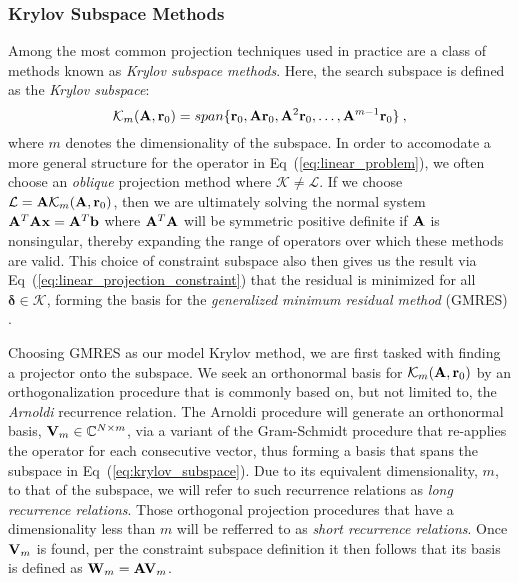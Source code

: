 \subsubsection{Krylov Subspace Methods}
\label{subsubsec:krylov_methods}
Among the most common projection techniques used in practice are a
class of methods known as \textit{Krylov subspace methods}. Here, the
search subspace is defined as the \textit{Krylov subspace}:
\begin{equation}
  \mathcal{K}_m(\mathbf{A},\mathbf{r}_0) = span\{\mathbf{r}_0, \mathbf{A}\mathbf{r}_0,
  \mathbf{A}^2\mathbf{r}_0, \dots, \mathbf{A}^{m-1}\mathbf{r}_0\}\:,
  \label{eq:krylov_subspace}
\end{equation}
where $m$ denotes the dimensionality of the subspace. In order to
accomodate a more general structure for the operator in
Eq~(\ref{eq:linear_problem}), we often choose an \textit{oblique}
projection method where $\mathcal{K} \neq \mathcal{L}$. If we choose
$\mathcal{L} = \mathbf{A} \mathcal{K}_m(\mathbf{A},\mathbf{r}_0)$, then we are
ultimately solving the normal system $\mathbf{A}^T\mathbf{A}\mathbf{x} =
\mathbf{A}^T\mathbf{b}$ where $\mathbf{A}^T\mathbf{A}$ will be symmetric positive
definite if $\mathbf{A}$ is nonsingular, thereby expanding the range of
operators over which these methods are valid. This choice of
constraint subspace also then gives us the result via
Eq~(\ref{eq:linear_projection_constraint}) that the residual is
minimized for all $\boldsymbol{\delta} \in \mathcal{K}$, forming the
basis for the \textit{generalized minimum residual method} (GMRES)
\citep{saad_1986}.

Choosing GMRES as our model Krylov method, we are first tasked with
finding a projector onto the subspace. We seek an orthonormal basis
for $\mathcal{K}_m(\mathbf{A},\mathbf{r}_0)$ by an orthogonalization procedure
that is commonly based on, but not limited to, the \textit{Arnoldi}
recurrence relation. The Arnoldi procedure will generate an
orthonormal basis, $\mathbf{V}_m \in \mathbb{C}^{N \times m}$, via a
variant of the Gram-Schmidt procedure that re-applies the operator for
each consecutive vector, thus forming a basis that spans the subspace
in Eq~(\ref{eq:krylov_subspace}). Due to its equivalent
dimensionality, $m$, to that of the subspace, we will refer to such
recurrence relations as \textit{long recurrence relations}. Those
orthogonal projection procedures that have a dimensionality less than
$m$ will be refferred to as \textit{short recurrence relations}.  Once
$\mathbf{V}_m$ is found, per the constraint subspace definition it then
follows that its basis is defined as $\mathbf{W}_m = \mathbf{A} \mathbf{V}_m$. 

